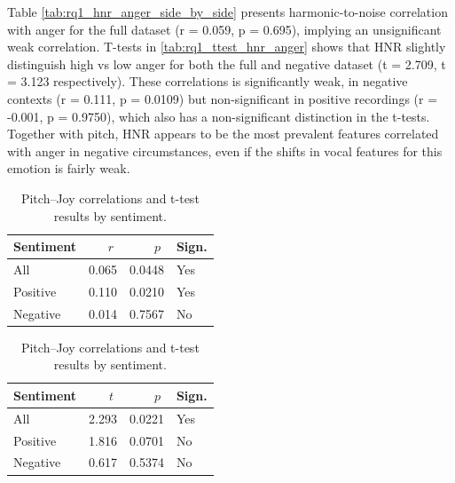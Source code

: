   Table \ref{tab:rq1_hnr_anger_side_by_side} presents harmonic-to-noise correlation with anger for the full dataset (r = 0.059, p = 0.695), implying an unsignificant weak correlation.  
  T-tests in \ref{tab:rq1_ttest_hnr_anger} shows that HNR slightly distinguish high vs low anger for both the full and negative dataset (t = 2.709, t = 3.123 respectively).
  These correlations is significantly weak, in negative contexts (r = 0.111, p = 0.0109) but non-significant in positive recordings (r = -0.001, p = 0.9750), which also has a non-significant distinction in the t-tests.
  Together with pitch, HNR appears to be the most prevalent features correlated with anger in negative circumstances, even if the shifts in vocal features for this emotion is fairly weak. 
  
  \begin{table}[H]
    \centering
  
    \begin{subtable}{0.45\textwidth}
      \centering
      \caption{Pitch and Joy (r)}\label{tab:rq1_corr_pitch_joy}
      \begin{tabular}{l r r l}
        \toprule
        Sentiment & \(\;r\;\) & \(\;p\;\) & Sign. \\
        \midrule
        All        & 0.065         & 0.0448    & Yes         \\
        Positive   & 0.110         & 0.0210    & Yes         \\
        Negative   & 0.014         & 0.7567    & No          \\
        \bottomrule
      \end{tabular}
    \end{subtable}\hfill
    \begin{subtable}{0.45\textwidth}
      \centering
      \caption{Pitch and Joy (t-test)}\label{tab:rq1_ttest_pitch_joy}
      \begin{tabular}{l r r l}
        \toprule
        Sentiment & \(\;t\;\) & \(\;p\;\) & Sign. \\
        \midrule
        All        & 2.293        & 0.0221    & Yes         \\
        Positive   & 1.816        & 0.0701    & No          \\
        Negative   & 0.617        & 0.5374    & No          \\
        \bottomrule
      \end{tabular}
    \end{subtable}
  
    \caption{Pitch–Joy correlations and t-test results by sentiment.}
    \label{tab:rq1_pitch_joy_side_by_side}
  \end{table}
  
